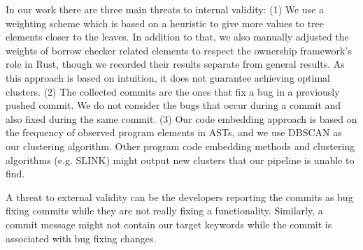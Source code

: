 In our work there are three main threats to internal validity: (1) We use a weighting scheme which is based on a heuristic to give more values to tree elements closer to the leaves. In addition to that, we also manually adjusted the weights of borrow checker related elements to respect the ownership framework's role in Rust, though we recorded their results separate from general results. As this approach is based on intuition, it does not guarantee achieving optimal clusters. (2) The collected commits are the ones that fix a bug in a previously pushed commit. We do not consider the bugs that occur during a commit and also fixed during the same commit. (3) Our code embedding approach is based on the frequency of observed program elements in ASTs, and we use DBSCAN as our clustering algorithm. Other program code embedding methods and clustering algorithms (e.g. SLINK) might output new clusters that our pipeline is unable to find. 

A threat to external validity can be the developers reporting the commits as bug fixing commits while they are not really fixing a functionality. Similarly, a commit message might not contain our target keywords while the commit is associated with bug fixing changes.
